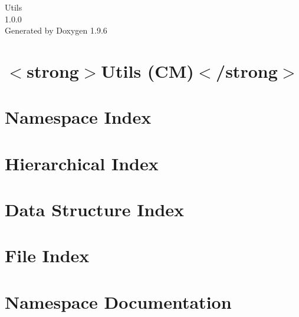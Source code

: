 \documentclass[twoside]{book}
\newcommand{\+}{\discretionary{\mbox{\scriptsize$\hookleftarrow$}}{}{}}
\newcommand{\clearemptydoublepage}{%
    \newpage{\pagestyle{empty}\cleardoublepage}%
  }
\begin{document}
  \raggedbottom
    \hypersetup{pageanchor=false,
                bookmarksnumbered=true,
                pdfencoding=unicode
               }
  \begin{titlepage}
  \vspace*{7cm}
  \begin{center}%
  {\Large Utils}\\
  [1ex]\large 1.\+0.\+0 \\
  \vspace*{1cm}
  {\large Generated by Doxygen 1.9.6}\\
  \end{center}
  \end{titlepage}
  \clearemptydoublepage
  \tableofcontents
  \clearemptydoublepage
  \hypersetup{pageanchor=true}
\chapter{\texorpdfstring{$<$}{<}strong\texorpdfstring{$>$}{>}Utils (CM)\texorpdfstring{$<$}{<}/strong\texorpdfstring{$>$}{>}}
\label{index}\hypertarget{index}{}
\chapter{Namespace Index}

\chapter{Hierarchical Index}

\chapter{Data Structure Index}

\chapter{File Index}

\chapter{Namespace Documentation}











\end{document}
